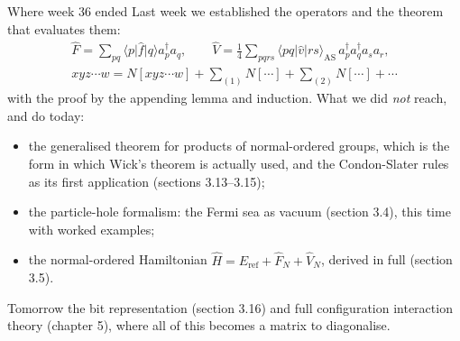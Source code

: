 \documentclass[aspectratio=169,10pt]{beamer}
\newcommand{\element}[3]{\langle #1\vert #2\vert #3\rangle}
\begin{document}
\begin{frame}{Where week 36 ended}
  Last week we established the operators and the theorem that evaluates them:
  \begin{gather*}
    \hat{F}=\sum_{pq}\element{p}{\hat{f}}{q}a_p^{\dagger}a_q,\qquad
    \hat{V}=\frac14\sum_{pqrs}\element{pq}{\hat{v}}{rs}_{\mathrm{AS}}\,a_p^{\dagger}a_q^{\dagger}a_sa_r,\\
    xyz\cdots w=N[xyz\cdots w]+\sum_{(1)}N[\cdots]+\sum_{(2)}N[\cdots]+\cdots
  \end{gather*}
  with the proof by the appending lemma and induction. What we did \emph{not} reach, and do today:
  \begin{itemize}
    \item the \alert{generalised theorem} for products of normal-ordered groups, which is the form in which Wick's theorem is actually used, and the Condon-Slater rules as its first application (sections 3.13--3.15);
    \item the \alert{particle-hole formalism}: the Fermi sea as vacuum (section 3.4), this time with worked examples;
    \item the \alert{normal-ordered Hamiltonian} $\hat{H}=E_{\mathrm{ref}}+\hat{F}_N+\hat{V}_N$, derived in full (section 3.5).
  \end{itemize}
  \vspace{0.3em}
  Tomorrow the bit representation (section 3.16) and full configuration interaction theory (chapter 5), where all of this becomes a matrix to diagonalise.
\end{frame}
\end{document}

